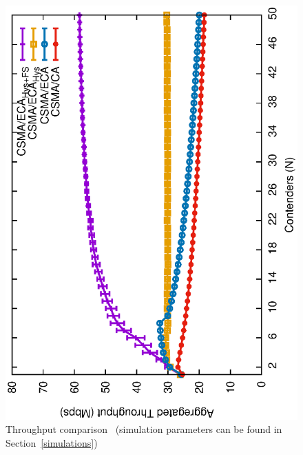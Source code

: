 	\begin{figure}[tb]
	\centering
		\includegraphics[width=0.7\linewidth,angle=-90]{figures/throughput-combined/throughput-combined-TON.eps}
		\caption{Throughput comparison~\cite{research2standards} (simulation parameters can be found in Section~\ref{simulations})}
		\label{fig:ECA+H+F-throughput}
	\end{figure}
	
